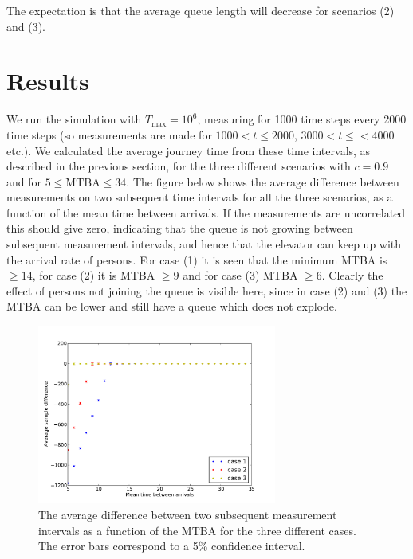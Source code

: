 \documentclass[10pt,a4paper]{article}
\begin{document}
\noindent The expectation is that the average queue length will decrease for scenarios (2) and (3).

\section{Results}

We run the simulation with $T_{\text{max}} = 10^6$, measuring for 1000 time steps every 2000 time steps (so measurements are made for $1000 < t \leq 2000$, $3000 < t \leq < 4000$ etc.). We calculated the average journey time from these time intervals, as described in the previous section, for the three different scenarios with $c = 0.9$ and for $5 \leq \text{MTBA} \leq 34$. The figure below shows the average difference between measurements on two subsequent time intervals for all the three scenarios, as a function of the mean time between arrivals. If the measurements are uncorrelated this should give zero, indicating that the queue is not growing between subsequent measurement intervals, and hence that the elevator can keep up with the arrival rate of persons. For case (1) it is seen that the minimum MTBA is $\geq 14$, for case (2) it is MTBA $\geq 9$ and for case (3) MTBA $\geq 6$. Clearly the effect of persons not joining the queue is visible here, since in case (2) and (3) the MTBA can be lower and still have a queue which does not explode.

\begin{figure}[H]
  \centering
  \includegraphics[width=0.7\textwidth]{diff.pdf}
  \caption{The average difference between two subsequent measurement intervals as a function of the MTBA for the three different cases. The error bars correspond to a 5\% confidence interval.}
  \label{fig:diff}
\end{figure}
\end{document}

